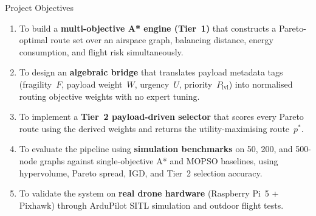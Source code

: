 \documentclass[aspectratio=169,11pt]{beamer}
\begin{document}
\begin{frame}{Project Objectives}
  \begin{enumerate}
    \item To build a \textbf{multi-objective A* engine (Tier~1)} that
          constructs a Pareto-optimal route set over an airspace graph,
          balancing distance, energy consumption, and flight risk simultaneously.
    \item To design an \textbf{algebraic bridge} that translates payload
          metadata tags (fragility~$F$, payload weight~$W$, urgency~$U$,
          priority~$P_\mathrm{lvl}$) into normalised routing objective
          weights with no expert tuning.
    \item To implement a \textbf{Tier~2 payload-driven selector} that scores
          every Pareto route using the derived weights and returns the
          utility-maximising route~$p^*$.
    \item To evaluate the pipeline using \textbf{simulation benchmarks} on
          50, 200, and 500-node graphs against single-objective A* and MOPSO
          baselines, using hypervolume, Pareto spread, IGD, and Tier~2
          selection accuracy.
    \item To validate the system on \textbf{real drone hardware}
          (Raspberry Pi~5 + Pixhawk) through ArduPilot SITL simulation and
          outdoor flight tests.
  \end{enumerate}
\end{frame}
\end{document}
